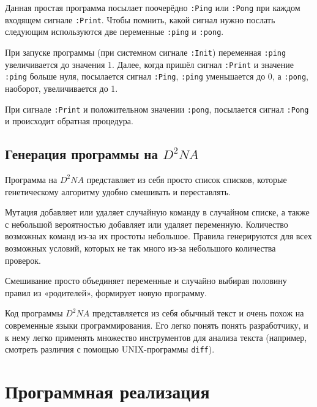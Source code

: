 \documentclass[a4paper,14pt]{extarticle}
\begin{document}
Данная простая программа посылает поочерёдно \texttt{:Ping} или \texttt{:Pong}
при каждом входящем сигнале \texttt{:Print}. Чтобы помнить, какой сигнал нужно
послать следующим используются две переменные \texttt{:ping} и \texttt{:pong}.

При запуске программы (при системном сигнале \texttt{:Init}) переменная
\texttt{:ping} увеличивается до значения 1. Далее, когда пришёл сигнал
\texttt{:Print} и значение \texttt{:ping} больше нуля, посылается сигнал
\texttt{:Ping}, \texttt{:ping} уменьшается до 0, а \texttt{:pong}, наоборот,
увеличивается до 1.

При сигнале \texttt{:Print} и положительном значении \texttt{:pong}, посылается
сигнал \texttt{:Pong} и происходит обратная процедура.

\subsection{Генерация программы на $D^2NA$}
Программа на $D^2NA$ представляет из себя просто список списков, которые
генетическому алгоритму удобно смешивать и переставлять.

Мутация добавляет или удаляет случайную команду в случайном списке, а также с
небольшой вероятностью добавляет или удаляет переменную. Количество возможных
команд из-за их простоты небольшое. Правила генерируются для всех возможных
условий, которых не так много из-за небольшого количества проверок.

Смешивание просто объединяет переменные и случайно выбирая половину правил из
«родителей», формирует новую программу.

Код программы $D^2NA$ представляется из себя обычный текст и очень похож на
современные языки программирования. Его легко понять понять разработчику,
и к нему легко применять множество инструментов для анализа текста (например,
смотреть различия с помощью UNIX-программы \texttt{diff}).

\section{Программная реализация}
\end{document}

